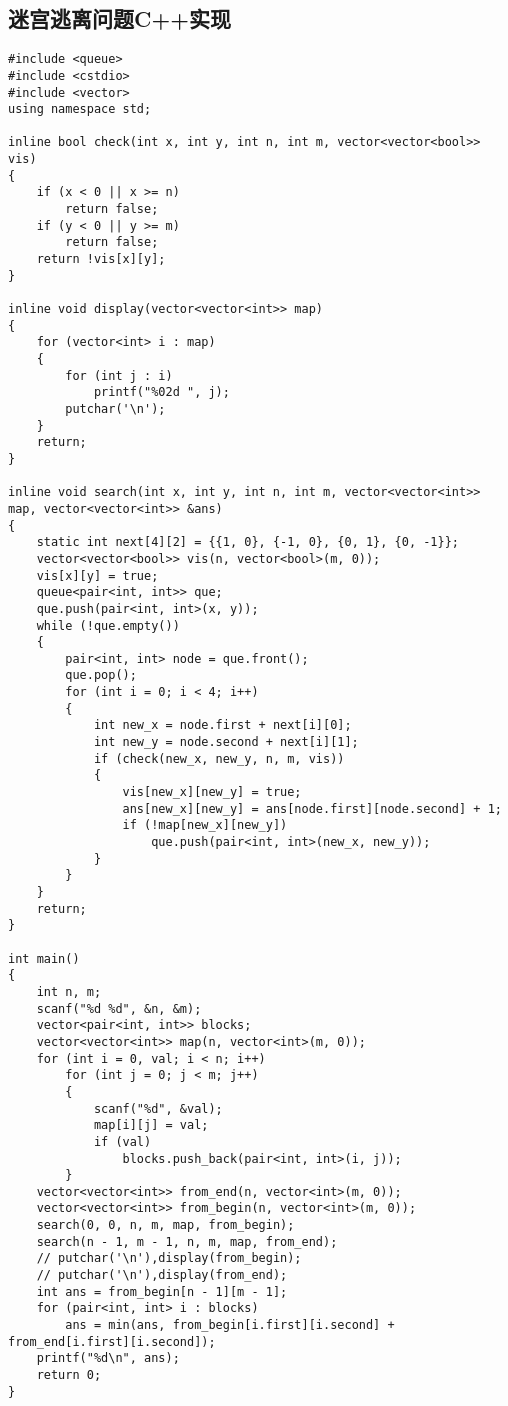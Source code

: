 \documentclass{article}
\begin{document}
\subsection{迷宫逃离问题C++实现}

\begin{lstlisting}
#include <queue>
#include <cstdio>
#include <vector>
using namespace std;

inline bool check(int x, int y, int n, int m, vector<vector<bool>> vis)
{
    if (x < 0 || x >= n)
        return false;
    if (y < 0 || y >= m)
        return false;
    return !vis[x][y];
}

inline void display(vector<vector<int>> map)
{
    for (vector<int> i : map)
    {
        for (int j : i)
            printf("%02d ", j);
        putchar('\n');
    }
    return;
}

inline void search(int x, int y, int n, int m, vector<vector<int>> map, vector<vector<int>> &ans)
{
    static int next[4][2] = {{1, 0}, {-1, 0}, {0, 1}, {0, -1}};
    vector<vector<bool>> vis(n, vector<bool>(m, 0));
    vis[x][y] = true;
    queue<pair<int, int>> que;
    que.push(pair<int, int>(x, y));
    while (!que.empty())
    {
        pair<int, int> node = que.front();
        que.pop();
        for (int i = 0; i < 4; i++)
        {
            int new_x = node.first + next[i][0];
            int new_y = node.second + next[i][1];
            if (check(new_x, new_y, n, m, vis))
            {
                vis[new_x][new_y] = true;
                ans[new_x][new_y] = ans[node.first][node.second] + 1;
                if (!map[new_x][new_y])
                    que.push(pair<int, int>(new_x, new_y));
            }
        }
    }
    return;
}

int main()
{
    int n, m;
    scanf("%d %d", &n, &m);
    vector<pair<int, int>> blocks;
    vector<vector<int>> map(n, vector<int>(m, 0));
    for (int i = 0, val; i < n; i++)
        for (int j = 0; j < m; j++)
        {
            scanf("%d", &val);
            map[i][j] = val;
            if (val)
                blocks.push_back(pair<int, int>(i, j));
        }
    vector<vector<int>> from_end(n, vector<int>(m, 0));
    vector<vector<int>> from_begin(n, vector<int>(m, 0));
    search(0, 0, n, m, map, from_begin);
    search(n - 1, m - 1, n, m, map, from_end);
    // putchar('\n'),display(from_begin);
    // putchar('\n'),display(from_end);
    int ans = from_begin[n - 1][m - 1];
    for (pair<int, int> i : blocks)
        ans = min(ans, from_begin[i.first][i.second] + from_end[i.first][i.second]);
    printf("%d\n", ans);
    return 0;
}
\end{lstlisting}
\end{document}
